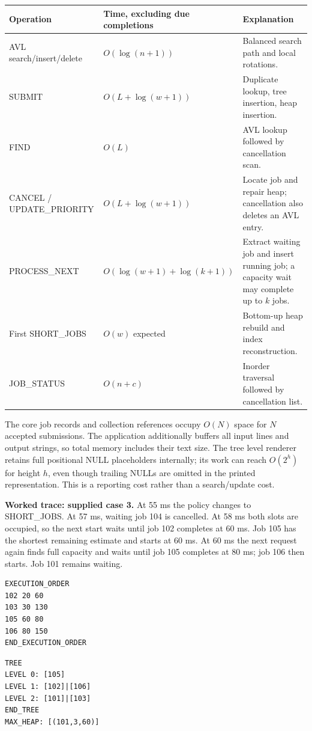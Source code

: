 \documentclass[10pt,letterpaper]{article}
\begin{document}
\begin{tabularx}{\linewidth}{@{}l l Y@{}}\toprule
\textbf{Operation} & \textbf{Time, excluding due completions} & \textbf{Explanation}\\\midrule
AVL search/insert/delete & $O(\log(n+1))$ & Balanced search path and local rotations.\\
SUBMIT & $O(L+\log(w+1))$ & Duplicate lookup, tree insertion, heap insertion.\\
FIND & $O(L)$ & AVL lookup followed by cancellation scan.\\
CANCEL / UPDATE\_PRIORITY & $O(L+\log(w+1))$ & Locate job and repair heap; cancellation also deletes an AVL entry.\\
PROCESS\_NEXT & $O(\log(w+1)+\log(k+1))$ & Extract waiting job and insert running job; a capacity wait may complete up to $k$ jobs.\\
First SHORT\_JOBS & $O(w)$ expected & Bottom-up heap rebuild and index reconstruction.\\
JOB\_STATUS & $O(n+c)$ & Inorder traversal followed by cancellation list.\\\bottomrule
\end{tabularx}

The core job records and collection references occupy $O(N)$ space for $N$ accepted submissions. The application additionally buffers all input lines and output strings, so total memory includes their text size. The tree level renderer retains full positional NULL placeholders internally; its work can reach $O(2^h)$ for height $h$, even though trailing NULLs are omitted in the printed representation. This is a reporting cost rather than a search/update cost.

\textbf{Worked trace: supplied case 3.} At 55 ms the policy changes to SHORT\_JOBS. At 57 ms, waiting job 104 is cancelled. At 58 ms both slots are occupied, so the next start waits until job 102 completes at 60 ms. Job 105 has the shortest remaining estimate and starts at 60 ms. At 60 ms the next request again finds full capacity and waits until job 105 completes at 80 ms; job 106 then starts. Job 101 remains waiting.

\begin{minipage}[t]{0.47\linewidth}
\begin{lstlisting}
EXECUTION_ORDER
102 20 60
103 30 130
105 60 80
106 80 150
END_EXECUTION_ORDER
\end{lstlisting}
\end{minipage}\hfill
\begin{minipage}[t]{0.50\linewidth}
\begin{lstlisting}
TREE
LEVEL 0: [105]
LEVEL 1: [102]|[106]
LEVEL 2: [101]|[103]
END_TREE
MAX_HEAP: [(101,3,60)]
\end{lstlisting}
\end{minipage}
\end{document}
